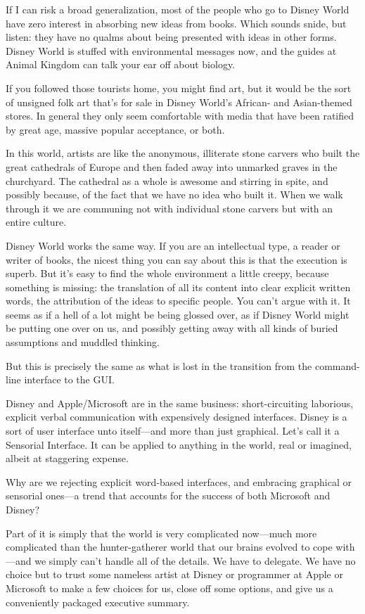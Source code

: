 \documentclass[
  fontsize=11pt,
  paper=landscape,
  twocolumn=true,
  pagesize=pdftex,
  headings=small,
  DIV=15,
  ]{scrartcl}
\begin{document}
If I can risk a broad generalization, most of the people who go to
Disney World have zero interest in absorbing new ideas from books. Which
sounds snide, but listen: they have no qualms about being presented with
ideas in other forms. Disney World is stuffed with environmental
messages now, and the guides at Animal Kingdom can talk your ear off
about biology.

If you followed those tourists home, you might find art, but it would be
the sort of unsigned folk art that's for sale in Disney World's African-
and Asian-themed stores. In general they only seem comfortable with
media that have been ratified by great age, massive popular acceptance,
or both.

In this world, artists are like the anonymous, illiterate stone carvers
who built the great cathedrals of Europe and then faded away into
unmarked graves in the churchyard. The cathedral as a whole is awesome
and stirring in spite, and possibly because, of the fact that we have no
idea who built it. When we walk through it we are communing not with
individual stone carvers but with an entire culture.

Disney World works the same way. If you are an intellectual type, a
reader or writer of books, the nicest thing you can say about this is
that the execution is superb. But it's easy to find the whole
environment a little creepy, because something is missing: the
translation of all its content into clear explicit written words, the
attribution of the ideas to specific people. You can't argue with it. It
seems as if a hell of a lot might be being glossed over, as if Disney
World might be putting one over on us, and possibly getting away with
all kinds of buried assumptions and muddled thinking.

But this is precisely the same as what is lost in the transition from
the command-line interface to the GUI.

Disney and Apple/Microsoft are in the same business: short-circuiting
laborious, explicit verbal communication with expensively designed
interfaces. Disney is a sort of user interface unto itself---and more
than just graphical. Let's call it a Sensorial Interface. It can be
applied to anything in the world, real or imagined, albeit at staggering
expense.

Why are we rejecting explicit word-based interfaces, and embracing
graphical or sensorial ones---a trend that accounts for the success of
both Microsoft and Disney?

Part of it is simply that the world is very complicated now---much more
complicated than the hunter-gatherer world that our brains evolved to
cope with---and we simply can't handle all of the details. We have to
delegate. We have no choice but to trust some nameless artist at Disney
or programmer at Apple or Microsoft to make a few choices for us, close
off some options, and give us a conveniently packaged executive summary.
\end{document}
